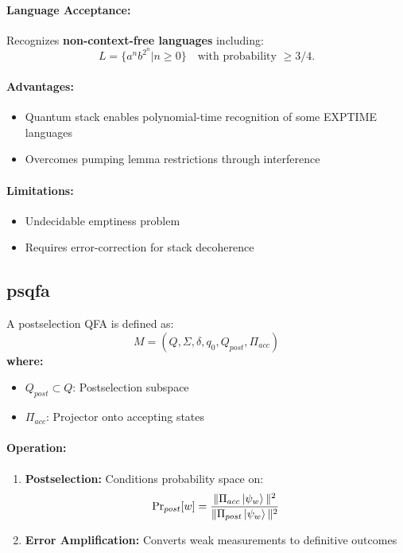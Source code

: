 \paragraph{Language Acceptance:}
Recognizes \textbf{non-context-free languages} including:
\[
L = \{a^nb^{2^n} | n \geq 0\} \quad \text{with probability } \geq 3/4. 
\]
\cite{bertoni2001quantum}

\paragraph{Advantages:}
\begin{itemize}
    \item Quantum stack enables polynomial-time recognition of some EXPTIME languages
    \item Overcomes pumping lemma restrictions through interference
\end{itemize}

\paragraph{Limitations:}
\begin{itemize}
    \item Undecidable emptiness problem
    \item Requires error-correction for stack decoherence
\end{itemize}

\subsection{\acrfull{psqfa}}
\label{subsec:psqfa}

\begin{definition}
A postselection QFA is defined as:
\[
M = (Q, \Sigma, \delta, q_0, Q_{post}, \Pi_{acc})
\]
\textbf{where:}
\begin{itemize}
    \item $Q_{post} \subset Q$: Postselection subspace
    \item $\Pi_{acc}$: Projector onto accepting states
\end{itemize}
\end{definition}

\paragraph{Operation:}
\begin{enumerate}
    \item \textbf{Postselection:} Conditions probability space on:
    \[
    \text{Pr}_{post}[w] = \frac{\|\Pi_{acc}\ket{\psi_w}\|^2}{\|\Pi_{post}\ket{\psi_w}\|^2}
    \]
    \item \textbf{Error Amplification:} Converts weak measurements to definitive outcomes \cite{yamakami2014constant}
\end{enumerate}

